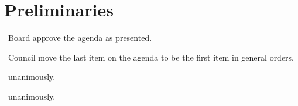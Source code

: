 \section*{Preliminaries}

\begin{information}
\end{information}

\begin{motion}
    \birt\ Board approve the agenda as presented.
    \movers{\seneca}{\brian}

    \begin{motion}
        \birt\ Council move the last item on the agenda to be the first item in
        general orders. 
        \movers{\antonio}{\jill}

        \carries\ unanimously.
    \end{motion}

    \carries\ unanimously.
\end{motion}
